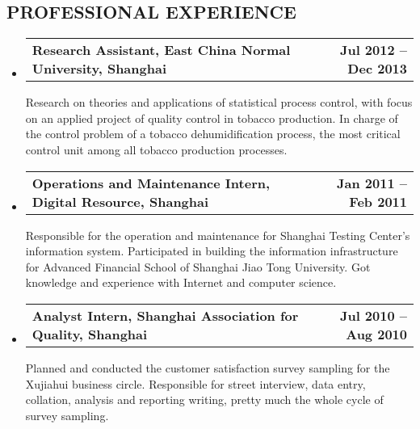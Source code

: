 \documentclass[10pt]{article}
\makeatletter
\newenvironment{unindentsection}[1]%
{\begin{list}{}%
	{\setlength{\leftmargin}{-0.5#1}}%
	\item[]%
}
{\end{list}}
\newcommand{\headerrow}[2]
{\begin{tabular*}{\linewidth}{l@{\extracolsep{\fill}}r}
	#1 &
	#2 \\
\end{tabular*}}
\makeatother
\begin{document}
\subsection*{\centering PROFESSIONAL EXPERIENCE}
\begin{unindentsection}{\parindent}
\begin{itemize}
	\item
	\headerrow
		{\textbf{Research Assistant, East China Normal University, Shanghai}}
		{\textbf{Jul 2012 – Dec 2013}}
		\indent Research on theories and applications of statistical process control,
		with focus on an applied project of quality control in tobacco
		production. In charge of the control problem of a tobacco
		dehumidification process, the most critical control unit among all
		tobacco production processes.
	
	\item
	\headerrow
		{\textbf{Operations and Maintenance Intern, Digital Resource, Shanghai}}
		{\textbf{Jan 2011 – Feb 2011}}
	\indent Responsible for the operation and maintenance for Shanghai Testing
	Center's information system. Participated in building the information
	infrastructure for Advanced Financial School of Shanghai Jiao Tong
	University. Got knowledge and experience with Internet and computer
	science.
	
	\item	
	\headerrow
		{\textbf{Analyst Intern, Shanghai Association for Quality, Shanghai}}
		{\textbf{Jul 2010 – Aug 2010}}
	\indent Planned and conducted the customer satisfaction survey sampling for the
	Xujiahui business circle. Responsible for street interview, data entry,
	collation, analysis and reporting writing, pretty much the whole cycle
	of survey sampling.
\end{itemize}
\end{unindentsection}
\end{document}
